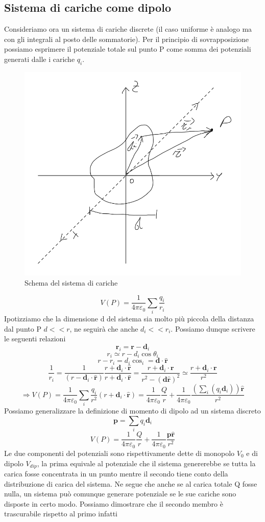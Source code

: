 \documentclass[10pt,a4paper]{article}
\begin{document}
\subsection{Sistema di cariche come dipolo}
Consideriamo ora un sistema di cariche discrete (il caso uniforme è analogo ma con gli integrali al posto delle sommatorie). Per il principio di sovrapposizione possiamo esprimere il potenziale totale sul punto P come somma dei potenziali generati dalle i cariche \(q_i\).
\begin{figure}[h!]
	\centering
	\includegraphics[width=0.5\linewidth]{images/sistema_dipolo}
	\caption{Schema del sistema di cariche}
	\label{fig:sistemadipolo}
\end{figure}
\FloatBarrier
\[V(P) = \frac{1}{4\pi\varepsilon_0}\sum_i \frac{q_i}{r_i}\]
Ipotizziamo che la dimensione d del sistema sia molto più piccola della distanza dal punto P \(d<<r\), ne seguirà che anche \(d_i<<r_i\). Possiamo dunque scrivere le seguenti relazioni
 \[\mathbf{r}_i = \mathbf{r} - \mathbf{d}_i\]
 \[r_i \simeq r-d_i\cos\theta_i\]
 \[r-r_i = d_i\cos_i = \mathbf{d}\cdot\hat{\mathbf{r}}\]
 \[\frac{1}{r_i} = \frac{1}{(r-\mathbf{d}_i\cdot\hat{\mathbf{r}})}\frac{r+\mathbf{d}_i\cdot\hat{\mathbf{r}}}{r+\mathbf{d}_i\cdot\hat{\mathbf{r}}} = \frac{r+\mathbf{d}_i\cdot\mathbf{r}}{r^2-(\mathbf{d}\hat{\mathbf{r}})^2} \simeq \frac{r+\mathbf{d}_i\cdot\mathbf{r}}{r^2}\]
 \[\Rightarrow V(P) =\frac{1}{4\pi\varepsilon_0}\sum_i \frac{q_i}{r^2}(r+\mathbf{d}_i\cdot\hat{\mathbf{r}}) = \frac{1}{4\pi\varepsilon_0}\frac{Q}{r}+\frac{1}{4\pi\varepsilon_0}\frac{(\sum_i(q_i\mathbf{d}_i))\hat{\mathbf{r}}}{r^2}\]
 Possiamo generalizzare la definizione di momento di dipolo ad un sistema discreto 
 \[\mathbf{p} = \sum_i q_i\mathbf{d}_i\]
 \[V(P) = \frac{1}{4\pi\varepsilon_0}\frac{Q}{r}+\frac{1}{4\pi\varepsilon_0}\frac{\mathbf{p}\hat{\mathbf{r}}}{r^2}\]
 Le due componenti del potenziali sono rispettivamente dette di monopolo \(V_0\) e di dipolo \(V_{dip}\), la prima equivale al potenziale che il sistema genererebbe se tutta la carica fosse concentrata in un punto mentre il secondo tiene conto della distribuzione di carica del sistema. Ne segue che anche se al carica totale Q fosse nulla, un sistema può comunque generare potenziale se le sue cariche sono disposte in certo modo. Possiamo dimostrare che il secondo membro è trascurabile rispetto al primo infatti
\end{document}
